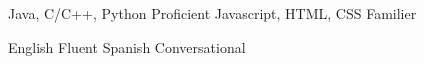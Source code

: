 \begin{cvhonors}
  \cvhonor
    {Java, C/C++, Python}
    {}
    {}
    {Proficient}
  \cvhonor
    {Javascript, HTML, CSS}
    {}
    {}
    {Familier}


  \cvhonor
    {English}
    {}
    {}
    {Fluent}
  \cvhonor
    {Spanish}
    {}
    {}
    {Conversational}

\end{cvhonors}
